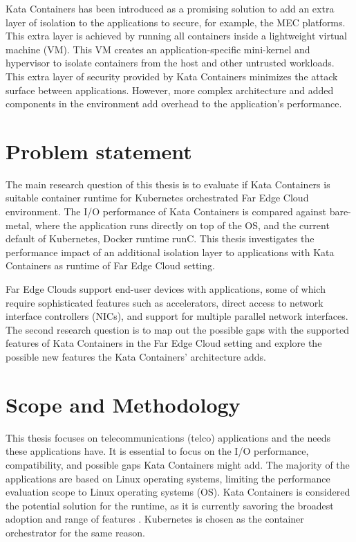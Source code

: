 Kata Containers \cite{KataContainers} has been introduced as a promising solution to add an extra layer of isolation to the applications to secure, for example, the MEC platforms. This extra layer is achieved by running all containers inside a lightweight virtual machine (VM). This VM creates an application-specific mini-kernel and hypervisor to isolate containers from the host and other untrusted workloads. This extra layer of security provided by Kata Containers minimizes the attack surface between applications. However, more complex architecture and added components in the environment add overhead to the application's performance.

\section{Problem statement}
\label{section:intro_problemstatement}

The main research question of this thesis is to evaluate if Kata Containers is suitable container runtime for Kubernetes orchestrated Far Edge Cloud environment. The I/O performance of Kata Containers is compared against bare-metal, where the application runs directly on top of the OS, and the current default of Kubernetes, Docker runtime runC. This thesis investigates the performance impact of an additional isolation layer to applications with Kata Containers as runtime of Far Edge Cloud setting.

Far Edge Clouds support end-user devices with applications, some of which require sophisticated features such as accelerators, direct access to network interface controllers (NICs), and support for multiple parallel network interfaces. The second research question is to map out the possible gaps with the supported features of Kata Containers in the Far Edge Cloud setting and explore the possible new features the Kata Containers' architecture adds.

\section{Scope and Methodology}
\label{section:intro_scopemethodology}

This thesis focuses on telecommunications (telco) applications and the needs these applications have. It is essential to focus on the I/O performance, compatibility, and possible gaps Kata Containers might add. The majority of the applications are based on Linux operating systems, limiting the performance evaluation scope to Linux operating systems (OS). Kata Containers is considered the potential solution for the runtime, as it is currently savoring the broadest adoption and range of features \cite{Flauzac2020}. Kubernetes is chosen as the container orchestrator for the same reason.

